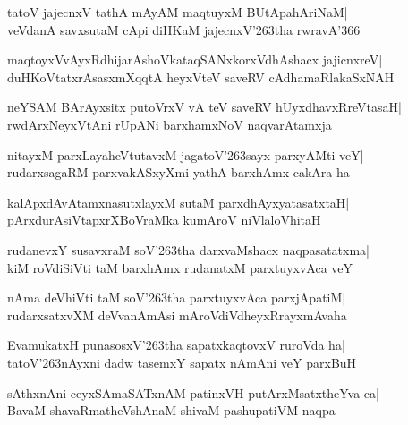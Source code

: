 \documentclass[twoside,12pt,openright]{book}
\def\S{\char'263}
\newcounter{shloka}[chapter]
\begin{document}
\begin{shloka}%
tatoV jajecnxV tathA mAyAM maqtuyxM BUtApahAriNaM|\\
veVdanA savxsutaM cApi diHKaM jajecnxV\S tha rwravA\char'366~
\end{shloka}

\begin{shloka}%
maqtoyxVvAyxRdhijarAshoVkataqSANxkorxVdhAshacx jajicnxreV|\\
duHKoVtatxrAsasxmXqqtA heyxVteV saveRV cAdhamaRlakaSxNAH
\end{shloka}

\begin{shloka}%
neYSAM BArAyxsitx putoVrxV vA teV saveRV hUyxdhavxRreVtasaH|\\
rwdArxNeyxVtAni rUpANi barxhamxNoV naqvarAtamxja
\end{shloka}

\begin{shloka}%
nitayxM parxLayaheVtutavxM jagatoV\S sayx parxyAMti veY|\\
rudarxsagaRM parxvakASxyXmi yathA barxhAmx cakAra ha
\end{shloka}

\begin{shloka}%
kalApxdAvAtamxnasutxlayxM sutaM parxdhAyxyatasatxtaH|\\
pArxdurAsiVtapxrXBoVraMka kumAroV niVlaloVhitaH
\end{shloka}

\begin{shloka}%
rudanevxY susavxraM soV\S tha darxvaMshacx naqpasatatxma|\\
kiM roVdiSiVti taM barxhAmx rudanatxM parxtuyxvAca veY
\end{shloka}

\begin{shloka}%
nAma deVhiVti taM soV\S tha parxtuyxvAca parxjApatiM|\\
rudarxsatxvXM deVvanAmAsi mAroVdiVdheyxRrayxmAvaha
\end{shloka}

\begin{shloka}%
EvamukatxH punasosxV\S tha sapatxkaqtovxV ruroVda ha|\\
tatoV\S nAyxni dadw tasemxY sapatx nAmAni veY parxBuH
\end{shloka}

\begin{shloka}%
sAthxnAni ceyxSAmaSATxnAM patinxVH putArxMsatxtheYva ca|\\
BavaM shavaRmatheVshAnaM shivaM pashupatiVM naqpa
\end{shloka}
\end{document}
